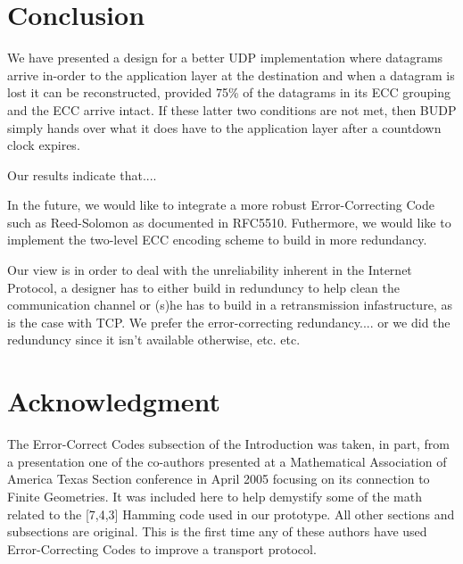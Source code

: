 \documentclass[conference]{IEEEtran}
\theoremstyle{definition}
\begin{document}
\section{Conclusion}
We have presented a design for a better UDP implementation
where datagrams arrive in-order to the application layer
at the destination and when a datagram is lost it can be
reconstructed, provided 75\% of the datagrams in its ECC
grouping and the ECC arrive intact.  If these latter two
conditions are not met, then BUDP simply hands over what
it does have to the application layer after a countdown
clock expires.

Our results indicate that....


In the future, we would like to integrate a more robust
Error-Correcting Code such as Reed-Solomon as documented
in RFC5510.  Futhermore, we would like to implement the
two-level ECC encoding scheme to build in more redundancy.

Our view is in order to deal with the unreliability inherent
in the Internet Protocol, a designer has to either build
in redunduncy to help clean the communication channel or
(s)he has to build in a retransmission infastructure, as
is the case with TCP.  We prefer the error-correcting redundancy....
or we did the redunduncy since it isn't available otherwise, etc.
etc.






\section*{Acknowledgment}
The Error-Correct Codes subsection of the Introduction
was taken, in part, from a presentation one of the co-authors
presented at a Mathematical Association of America
Texas Section conference in April 2005 \cite{clanton2005maa}
focusing on its connection to Finite Geometries.
It was included here to help demystify some of the math
related to the [7,4,3] Hamming code used in our prototype.
All other sections and subsections are original.  This is the
first time any of these authors have used Error-Correcting
Codes to improve a transport protocol.




\end{document}
